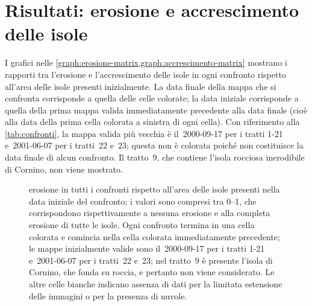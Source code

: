 \section{Risultati: erosione e accrescimento delle isole}
\label{sec:camb-ris}
I grafici nelle \cref{graph:erosione-matrix,graph:accrescimento-matrix} mostrano i rapporti tra l'erosione e l'accrescimento delle isole in ogni confronto rispetto all'area delle isole presenti inizialmente.
La data finale della mappa che si confronta corrisponde a quella delle celle colorate; la data iniziale corrisponde a quella della prima mappa valida immediatamente precedente alla data finale (cioè alla data della prima cella colorata a sinistra di ogni cella).
Con riferimento alla \cref{tab:confronti}, la mappa valida più vecchia è il~2000-09-17 per i tratti 1-21 e~2001-06-07 per i tratti~22 e~23; questa non è colorata poiché non costituisce la data finale di alcun confronto.
Il tratto~9, che contiene l'isola rocciosa inerodibile di Cornino, non viene mostrato.
%
\begin{figure}
	\centering
	
	\caption[erosione in tutti i confronti rispetto all'area delle isole presenti inizialmente]{erosione in tutti i confronti rispetto all'area delle isole presenti nella data iniziale del confronto; i valori sono compresi tra \numrange[range-phrase = { e }]{0}{1}, che corrispondono rispettivamente a nessuna erosione e alla completa erosione di tutte le isole.
	Ogni confronto termina in una cella colorata e comincia nella cella colorata immediatamente precedente; le mappe inizialmente valide sono il~2000-09-17 per i tratti 1-21 e~2001-06-07 per i tratti~22 e~23; nel tratto~9 è presente l'isola di Cornino, che fonda su roccia, e pertanto non viene considerato.
	Le altre celle bianche indicano assenza di dati per la limitata estensione delle immagini o per la presenza di nuvole.}
	\label{graph:erosione-matrix}
\end{figure}
%

